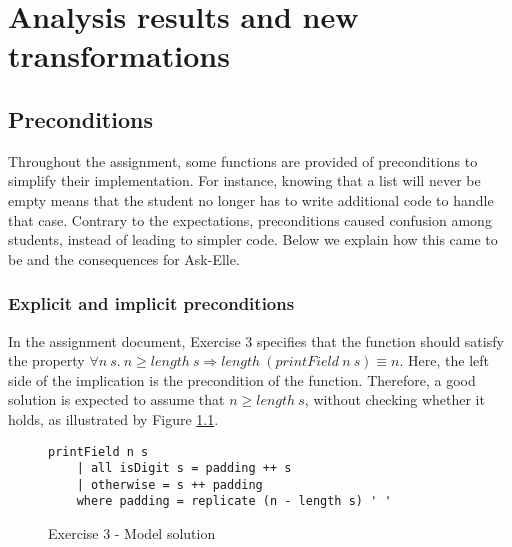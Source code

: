 \chapter{Analysis results and new transformations}
\label{sec:analysis-results}





\section{Preconditions}
\label{sec:analysis-preconditions}

Throughout the assignment, some functions are provided of preconditions to simplify their implementation. For instance, knowing that a list will never be empty means that the student no longer has to write additional code to handle that case. Contrary to the expectations, preconditions caused confusion among students, instead of leading to simpler code. Below we explain how this came to be and the consequences for Ask-Elle. %

\subsection{Explicit and implicit preconditions}

In the assignment document, Exercise 3 specifies that the function  should satisfy the property $\forall n\ s.\ n \geq length\ s \Rightarrow length\ (printField\ n\ s) \equiv n$. Here, the left side of the implication is the precondition of the function. Therefore, a good solution is expected to assume that $n \geq length\ s$, without checking whether it holds, as illustrated by Figure \ref{fig:ex3-model-solution}.

\begin{figure}[H]
\centering
\begin{verbatim}
printField n s
    | all isDigit s = padding ++ s
    | otherwise = s ++ padding
    where padding = replicate (n - length s) ' '
\end{verbatim}
\caption{Exercise 3 - Model solution}
\label{fig:ex3-model-solution}
\end{figure}

